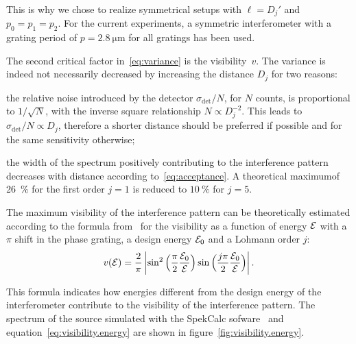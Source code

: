 This is why we chose to realize symmetrical setups with $\ell = D_j'$ and
$p_0 = p_1 = p_2$. For the current experiments, a symmetric interferometer
with a grating period of $p = \SI{2.8}{\micro\metre}$ for all gratings has
been used.

The second critical factor in~\eqref{eq:variance} is the visibility~$v$. The
variance is indeed not necessarily decreased by increasing the distance
$D_j$ for two reasons:
\begin{aenumerate}
    \item the relative noise introduced by the detector
        $\sigma_{\text{det}}/N$, for
        $N$ counts, is proportional to $1 / \sqrt{N}$, with the inverse
        square relationship $N \propto
        D_j^{-2}$. This leads to $\sigma_{\text{det}}/N \propto D_j$,
        therefore a shorter distance should be preferred if possible and for
        the same sensitivity otherwise;
    \item the width of the spectrum positively contributing to the
        interference pattern decreases with distance according
        to~\eqref{eq:acceptance}. A theoretical maximum\cn of
        \SI{26}{\percent} for the first order $j = 1$ is reduced to
        $\SI{10}{\percent}$ for $j = 5$.
\end{aenumerate}
The maximum visibility of the interference pattern can be theoretically
estimated according to the formula from~\cite{Thuering20130027} for the visibility as a function
of energy $\mathcal{E}$ with a $\pi$ shift in the phase grating, a design energy
$\mathcal{E}_0$ and a Lohmann order $j$:
\begin{equation}
            v(\mathcal{E}) = \frac{2}{\pi} \left\lvert \sin^2
            \Big(\frac{\pi}{2}\frac{\mathcal{E}_0}{\mathcal{E}}\Big) 
            \sin
            \Big(\frac{j\pi}{2}\frac{\mathcal{E}_0}{\mathcal{E}}\Big) 
            \right\rvert.
    \label{eq:visibility.energy}
\end{equation}

This formula indicates how energies different from the design energy of the
interferometer contribute to the visibility of the interference pattern. The
spectrum of the source simulated with the SpekCalc sofware~\cite{spekcalc}
and equation~\eqref{eq:visibility.energy} are shown in
figure~\ref{fig:visibility.energy}.

